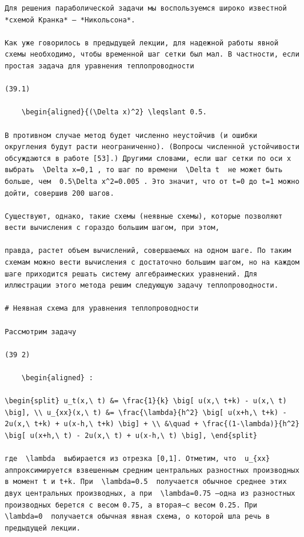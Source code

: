 \documentclass[
  ukrainian,
]{article}
\begin{document}
\begin{verbatim}
Для решения параболической задачи мы воспользуемся широко известной *схемой Кранка* — *Никольсона*.

Как уже говорилось в предыдущей лекции, для надежной работы явной схемы необходимо, чтобы временной шаг сетки был мал. В частности, если простая задача для уравнения теплопроводности

(39.1)

    \begin{aligned}{(\Delta x)^2} \leqslant 0.5.

В противном случае метод будет численно неустойчив (и ошибки округления будут расти неограниченно). (Вопросы численной устойчивости обсуждаются в работе [53].) Другими словами, если шаг сетки по оси x выбрать  \Delta x=0,1 , то шаг по времени  \Delta t  не может быть больше, чем  0.5\Delta x^2=0.005 . Это значит, что от t=0 до t=1 можно дойти, совершив 200 шагов.

Существуют, однако, такие схемы (неявные схемы), которые позволяют вести вычисления с гораздо большим шагом, при этом,

правда, растет объем вычислений, совершаемых на одном шаге. По таким схемам можно вести вычисления с достаточно большим шагом, но на каждом шаге приходится решать систему алгебраимеских уравнений. Для иллюстрации этого метода решим следующую задачу теплопроводности.

# Неявная схема для уравнения теплопроводности

Рассмотрим задачу

(39 2)

    \begin{aligned} :

\begin{split} u_t(x,\ t) &= \frac{1}{k} \big[ u(x,\ t+k) - u(x,\ t) \big], \\ u_{xx}(x,\ t) &= \frac{\lambda}{h^2} \big[ u(x+h,\ t+k) - 2u(x,\ t+k) + u(x-h,\ t+k) \big] + \\ &\quad + \frac{(1-\lambda)}{h^2} \big[ u(x+h,\ t) - 2u(x,\ t) + u(x-h,\ t) \big], \end{split}

где  \lambda  выбирается из отрезка [0,1]. Отметим, что  u_{xx}  аппроксимируется взвешенным средним центральных разностных производных в момент t и t+k. При  \lambda=0.5  получается обычное среднее этих двух центральных производных, а при  \lambda=0.75 —одна из разностных производных берется с весом 0.75, а вторая—с весом 0.25. При  \lambda=0  получается обычная явная схема, о которой шла речь в предыдущей лекции.


\end{verbatim}
\end{document}
